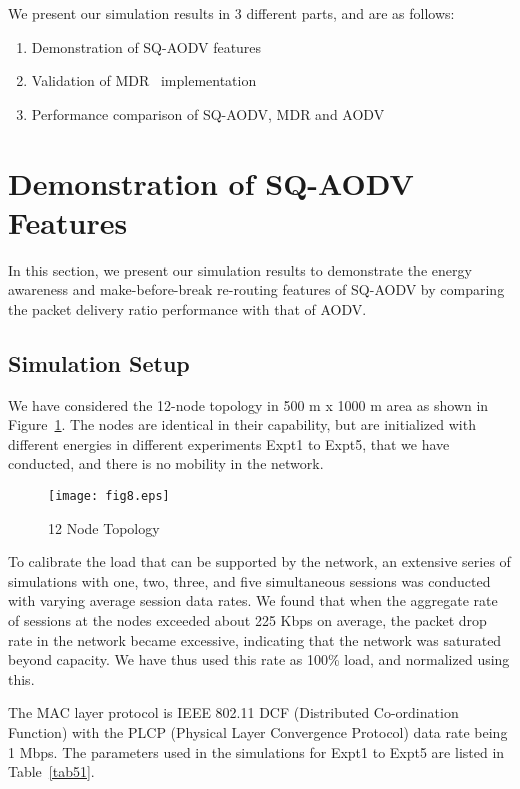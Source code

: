 \noindent
We present our simulation results in 3 different parts, and are as follows:

\begin{enumerate}
\item Demonstration of SQ-AODV features
\item Validation of MDR~\cite{mdr} implementation
\item Performance comparison of SQ-AODV, MDR and AODV~\cite{aodv}
\end{enumerate}

\section{Demonstration of SQ-AODV Features}
\label{sq-aodv features}

In this section, we present our simulation results to demonstrate the energy awareness and make-before-break re-routing features of SQ-AODV by comparing the packet delivery ratio performance with that of AODV.

\subsection{Simulation Setup}
We have considered the 12-node topology in 500 m x 1000 m area as shown in Figure~\ref{fig51}. The nodes are identical in their capability, but are initialized with different energies in different experiments Expt1 to Expt5, that we have conducted, and there is no mobility in the network.

\begin{figure}[htbp]
	\centering
	\texttt{[image: fig8.eps]}
	\caption{12 Node Topology}
	\label{fig51}
\end{figure}

To calibrate the load that can be supported by the network, an extensive series of simulations with one, two, three, and five simultaneous sessions was conducted with varying average session data rates. We found that when the aggregate rate of sessions at the nodes exceeded about 225 Kbps on average, the packet drop rate in the network became excessive, indicating that the network was saturated beyond capacity. We have thus used this rate as 100\% load, and normalized using this.

The MAC layer protocol is IEEE 802.11 DCF  (Distributed Co-ordination Function) with the PLCP (Physical Layer Convergence Protocol)  data rate being 1 Mbps. The parameters used in the simulations for Expt1 to Expt5 are listed in Table~\ref{tab51}.

